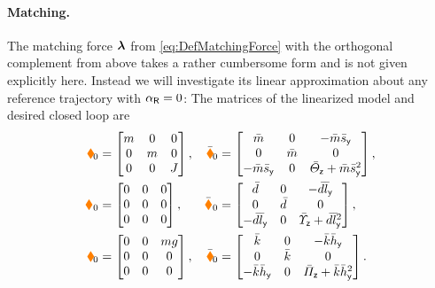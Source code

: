 
\paragraph{Matching.}
The matching force $\boldsymbol{\lambda}$ from \eqref{eq:DefMatchingForce} with the orthogonal complement from above takes a rather cumbersome form and is not given explicitly here.
Instead we will investigate its linear approximation about any reference trajectory with $\alpha_{\mathsf{R}} = 0$: The matrices of the linearized model and desired closed loop are
\begin{subequations}
\begin{align}
 \boldsymbol{\textcolor{orange}{\blacklozenge}}_{\!\text{0}} &= \begin{bmatrix} m & 0 & 0 \\ 0 & m & 0 \\ 0 & 0 & J \end{bmatrix},&
 \bar{\boldsymbol{\textcolor{orange}{\blacklozenge}}}_{\!\text{0}} &= \begin{bmatrix} \bar{m} & 0 & -\bar{m}\bar{s}_{\mathsf{y}} \\ 0 & \bar{m} & 0 \\ -\bar{m}\bar{s}_{\mathsf{y}} & 0 & \bar{\varTheta}_{\mathsf{z}} + \bar{m}\bar{s}_{\mathsf{y}}^2 \end{bmatrix},
\\
 \boldsymbol{\textcolor{orange}{\blacklozenge}}_{\text{0}} &= \begin{bmatrix} 0 & 0 & 0 \\ 0 & 0 & 0 \\ 0 & 0 & 0 \end{bmatrix},&
 \bar{\boldsymbol{\textcolor{orange}{\blacklozenge}}}_{\text{0}} &= \begin{bmatrix} \bar{d} & 0 & -\bar{d}\bar{l}_{\mathsf{y}} \\ 0 & \bar{d} & 0 \\ -\bar{d}\bar{l}_{\mathsf{y}} & 0 & \bar{\varUpsilon}_{\mathsf{z}} + \bar{d}\bar{l}_{\mathsf{y}}^2 \end{bmatrix},
\\
 \boldsymbol{\textcolor{orange}{\blacklozenge}}_{\!\text{0}} &= \begin{bmatrix} 0 & 0 & m g \\ 0 & 0 & 0 \\ 0 & 0 & 0 \end{bmatrix},&
 \bar{\boldsymbol{\textcolor{orange}{\blacklozenge}}}_{\!\text{0}} &= \begin{bmatrix} \bar{k} & 0 & -\bar{k}\bar{h}_{\mathsf{y}} \\ 0 & \bar{k} & 0 \\ -\bar{k}\bar{h}_{\mathsf{y}} & 0 & \bar{\varPi}_{\mathsf{z}} + \bar{k}\bar{h}_{\mathsf{y}}^2 \end{bmatrix}.
\end{align}
\end{subequations}
